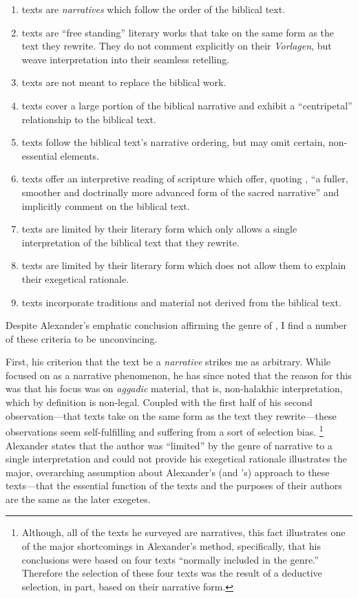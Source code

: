 \begin{enumerate}
    \item \rwb texts are \emph{narratives} which follow the order of the biblical text. 
    \item \rwb texts are ``free standing'' literary works that take on the same form as the text they rewrite. They do not comment explicitly on their \emph{Vorlagen}, but weave interpretation into their seamless retelling. 
    \item \rwb texts are not meant to replace the biblical work. 
    \item \rwb texts cover a large portion of the biblical narrative and exhibit a ``centripetal'' relationship to the biblical text. 
    \item \rwb texts follow the biblical text's narrative ordering, but may omit certain, non-essential elements. 
    \item \rwb texts offer an interpretive reading of scripture which offer, quoting \vermes, ``a fuller, smoother and doctrinally more advanced form of the sacred narrative''\autocite[Citing \vermes in][305]{schurer1986} and implicitly comment on the biblical text. 
    \item \rwb texts are limited by their literary form which only allows a single interpretation of the biblical text that they rewrite. 
    \item \rwb texts are limited by their literary form which does not allow them to explain their exegetical rationale. 
    \item \rwb texts incorporate traditions and material not derived from the biblical text.
\end{enumerate} 

Despite Alexander's emphatic conclusion affirming the genre of \RwB, I find a number of these criteria to be unconvincing.

First, his criterion that the text be a \emph{narrative} strikes me as arbitrary. While \vermes focused on \rwb as a narrative phenomenon, he has since noted that the reason for this was that his focus was on \emph{aggadic} material, that is, non-halakhic interpretation, which by definition is non-legal. Coupled with the first half of his second observation---that \rwb texts take on the same form as the text they rewrite---these observations seem self-fulfilling and suffering from a sort of selection bias.%
%
\footnote{Although,   all of the texts he surveyed are narratives, this fact illustrates one   of the major shortcomings in Alexander's method, specifically, that   his conclusions were based on four texts ``normally included in the   genre.''\autocite[99]{alexander_carson-williamson1988} Therefore the   selection of these four texts was the result of a deductive selection,   in part, based on their narrative form.}
%
Alexander states that the author was ``limited'' by the genre of narrative to a single interpretation and could not provide his exegetical rationale illustrates the major, overarching assumption about Alexander's (and \vermes's) approach to these texts---that the essential function of the texts and the purposes of their authors are the same as the later exegetes.

